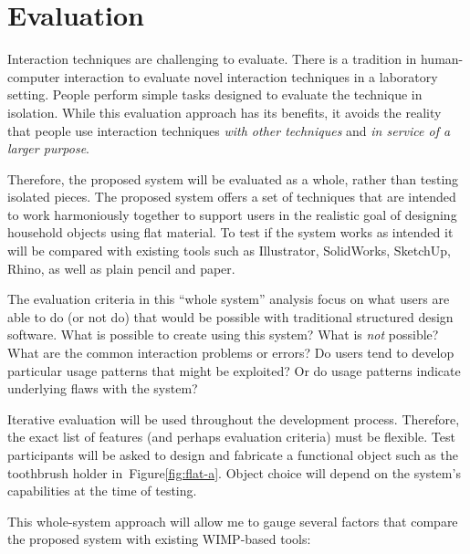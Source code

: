 \documentclass[11pt]{article}
\begin{document}


\section{Evaluation}

Interaction techniques are challenging to evaluate. There is a
tradition in human-computer interaction to evaluate novel interaction
techniques in a laboratory setting. People perform simple tasks
designed to evaluate the technique in isolation. While this evaluation
approach has its benefits, it avoids the reality that people use
interaction techniques \textit{with other techniques} and \textit{in
  service of a larger purpose}. 

Therefore, the proposed system will be evaluated as a whole, rather
than testing isolated pieces. The proposed system offers a set of
techniques that are intended to work harmoniously together to support
users in the realistic goal of designing household objects using flat
material. To test if the system works as intended it will be compared
with existing tools such as Illustrator, SolidWorks, SketchUp, Rhino,
as well as plain pencil and paper.

The evaluation criteria in this ``whole system'' analysis focus on
what users are able to do (or not do) that would be possible with
traditional structured design software. What is possible to create
using this system? What is \textit{not} possible? What are the common
interaction problems or errors? Do users tend to develop particular
usage patterns that might be exploited? Or do usage patterns indicate
underlying flaws with the system?

Iterative evaluation will be used throughout the development
process. Therefore, the exact list of features (and perhaps evaluation
criteria) must be flexible. Test participants will be asked to design
and fabricate a functional object such as the toothbrush holder
in~Figure\ref{fig:flat-a}. Object choice will depend on the system's
capabilities at the time of testing.

This whole-system approach will allow me to gauge several factors that
compare the proposed system with existing WIMP-based tools:
\end{document}
